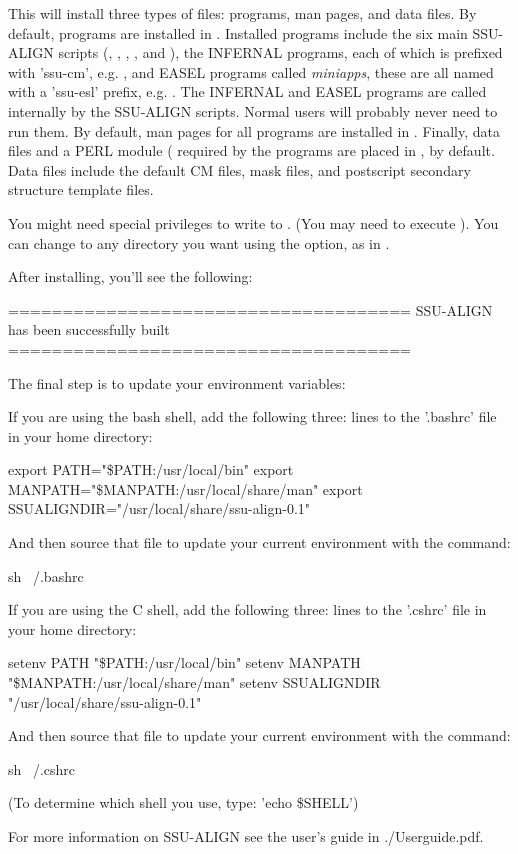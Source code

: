 
This will install three types of files: programs, man pages, and data
files.  By default, programs are installed in
. Installed programs include the six main
SSU-ALIGN scripts (, ,
, ,  and
), the INFERNAL programs, each of which is prefixed
with 'ssu-cm', e.g. , and EASEL programs
called \emph{miniapps}, these are all named with a 'ssu-esl'
prefix, e.g. . The INFERNAL and
EASEL programs are called internally by the SSU-ALIGN scripts. Normal
users will probably never need to run them.  By default, man pages for
all programs are installed in .  Finally,
data files and a PERL module ( required by the programs
are placed in , by default. Data
files include the default CM files, mask files, and postscript
secondary structure template files.

You might need special privileges to write to . (You may need to execute
). You can change  to any
directory you want using the  option, as in
.

After installing, you'll see the following:

\begin{sreoutput}
=====================================
SSU-ALIGN has been successfully built
=====================================

The final step is to update your environment variables:

If you are using the bash shell, add the following three:
lines to the '.bashrc' file in your home directory:

export PATH="\$PATH:/usr/local/bin"
export MANPATH="\$MANPATH:/usr/local/share/man"
export SSUALIGNDIR="/usr/local/share/ssu-align-0.1"

And then source that file to update your current
environment with the command:

sh ~/.bashrc

If you are using the C shell, add the following three:
lines to the '.cshrc' file in your home directory:

setenv PATH "\$PATH:/usr/local/bin"
setenv MANPATH "\$MANPATH:/usr/local/share/man"
setenv SSUALIGNDIR "/usr/local/share/ssu-align-0.1"

And then source that file to update your current
environment with the command:

sh ~/.cshrc

(To determine which shell you use, type: 'echo \$SHELL')

For more information on SSU-ALIGN see the user's guide
in ./Userguide.pdf.
\end{sreoutput}

